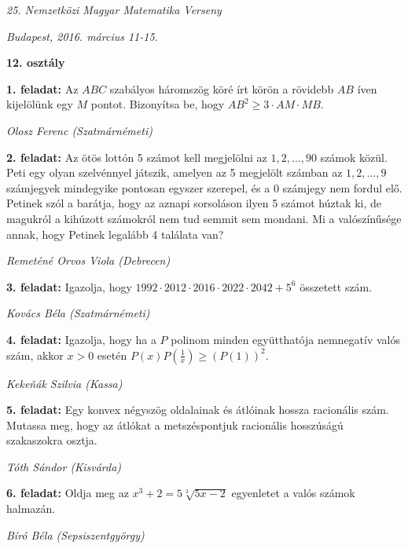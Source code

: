 \documentclass[a4paper,10pt]{article}
\newcommand{\ki}[2]{\hfill {\it #1 (#2)}\medskip}
\begin{document}
\begin{center} \Large {\em 25. Nemzetközi Magyar Matematika Verseny} \end{center}
\begin{center} \large{\em Budapest, 2016. március 11-15.} \end{center}
\smallskip
\begin{center} \large{\bf 12. osztály} \end{center}
\bigskip 

{\bf 1. feladat: } Az $ABC$ szabályos háromszög köré írt körön a rövidebb $AB$ íven
kijelölünk egy $M$ pontot. Bizonyítsa be, hogy $AB^2\ge 3\cdot AM\cdot MB$.

\ki{Olosz Ferenc}{Szatmárnémeti}\medskip

{\bf 2. feladat: } Az ötös lottón 5 számot kell megjelölni az
$1,2,\dots,90$ számok közül. Peti egy olyan szelvénnyel játszik, amelyen az 5
megjelölt számban  az $1,2,\dots,9$ számjegyek mindegyike pontosan egyszer
szerepel, és a 0 számjegy nem fordul elő. Petinek szól a barátja, hogy
az aznapi sorsoláson ilyen 5 számot húztak ki, de magukról a kihúzott
számokról nem tud semmit sem mondani. Mi a valószínűsége annak, hogy
Petinek legalább 4 találata van?

\ki{Remeténé Orvos Viola}{Debrecen}\medskip

{\bf 3. feladat: } Igazolja, hogy
$1992\cdot2012\cdot2016\cdot2022\cdot2042+5^6$ összetett szám.

\ki{Kovács Béla}{Szatmárnémeti}\medskip

{\bf 4. feladat: } Igazolja, hogy ha a $P$ polinom minden együtthatója nemnegatív valós szám, akkor $x>0$ esetén $P(x)P(\frac1x)\geq (P(1))^2$.

\ki{Keke\v{n}ák Szilvia}{Kassa}\medskip

{\bf 5. feladat: } Egy konvex négyszög oldalainak és átlóinak
hossza racionális szám. Mutassa meg, hogy az átlókat a metszéspontjuk
racionális hosszúságú szakaszokra osztja.

\ki{Tóth Sándor}{Kisvárda}\medskip

{\bf 6. feladat: } Oldja meg az $x^3+2=5\sqrt[3]{5x-2}$ egyenletet a valós számok halmazán.

\ki{Bíró Béla}{Sepsiszentgyörgy}\medskip
\end{document}
